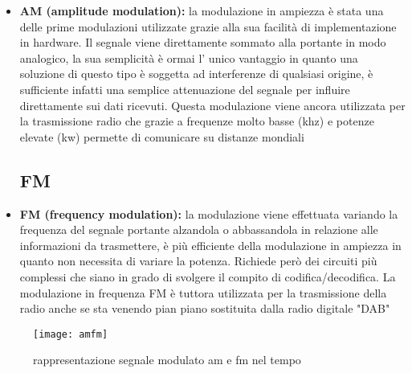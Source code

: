\begin{itemize}
	\subsection{}
  \item \textbf{AM (amplitude modulation): } la modulazione in ampiezza è stata una delle prime modulazioni utilizzate grazie alla sua facilità di implementazione in hardware. Il segnale viene direttamente sommato alla portante in modo analogico, la sua semplicità è ormai l' unico vantaggio in quanto una soluzione di questo tipo è soggetta ad interferenze di qualsiasi origine, è sufficiente infatti una semplice attenuazione del segnale per influire direttamente sui dati ricevuti. Questa modulazione viene ancora utilizzata per la trasmissione radio che grazie a frequenze molto basse (khz) e potenze elevate (kw) permette di comunicare su distanze mondiali
   \subsection{FM}
   \item \textbf{FM (frequency modulation): } la modulazione viene effettuata variando la frequenza del segnale portante alzandola o abbassandola in relazione alle informazioni da trasmettere, è più efficiente della modulazione in ampiezza in quanto non necessita di variare la potenza. Richiede però dei circuiti più complessi che siano in grado di svolgere il compito di codifica/decodifica. La modulazione in frequenza FM è tuttora utilizzata per la trasmissione della radio anche se sta venendo pian piano sostituita dalla radio digitale "DAB"
  \end{itemize}
  \begin{figure}[h]
  	\centering
  	\texttt{[image: amfm]}
  	\caption{rappresentazione segnale modulato am e fm nel tempo}\label{fig:1}
  \end{figure}


